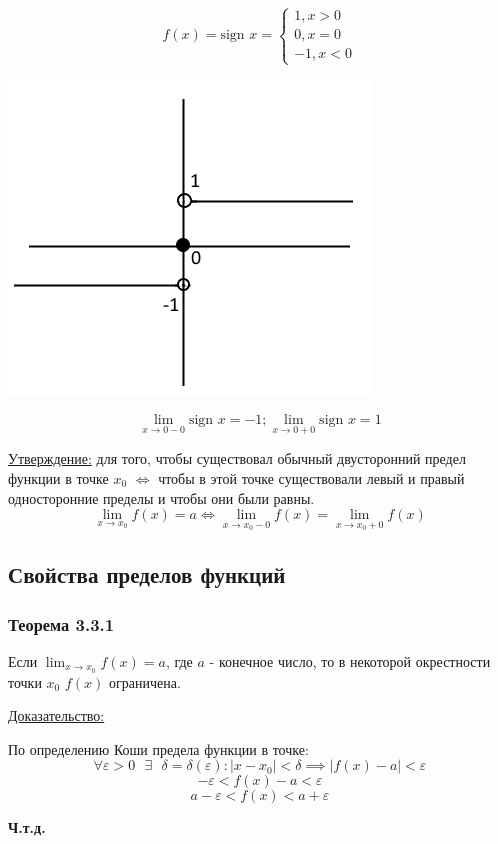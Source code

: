 \documentclass[12pt]{article}
\begin{document}
    \begin{adjustwidth}{1.5em}{1.5em}
        \[f(x) = \text{sign } x = \begin{cases}
            1, x > 0\\
            0, x = 0\\
            -1, x < 0
        \end{cases}
        \]
        \begin{center}
            \includegraphics{3.2.3}
        \end{center}
        \[
            \lim_{x\to 0-0} \text{sign } x = -1; \lim_{x\to 0+0} \text{sign } x = 1
        \]
    \end{adjustwidth}
    \underline{Утверждение:} для того, чтобы существовал обычный двусторонний предел функции в точке $x_0$ $\Leftrightarrow$ чтобы в этой точке существовали левый и правый односторонние пределы и чтобы они были равны.
    \[ \lim_{x \to x_0} f(x) = a \Leftrightarrow \lim_{x \to x_0 - 0}f(x) = \lim_{x \to x_0 + 0} f(x) \]

    \subsection{Свойства пределов функций}
    \subsubsection*{Теорема 3.3.1}\label{th:3.3.1}
    Если $\lim_{x\to x_0}f(x) = a$, где $a$ - конечное число, то в некоторой окрестности точки $x_0$ $f(x)$ ограничена.\par\noindent
    \underline{Доказательство:}
    \begin{adjustwidth}{1.5em}{1.5em}
        По определению Коши предела функции в точке:
        \[ \forall \varepsilon > 0 \text{ } \exists \text{ } \delta = \delta(\varepsilon) : |x - x_0| < \delta \implies |f(x) - a| < \varepsilon \]
        \[ -\varepsilon < f(x) - a < \varepsilon \]
        \[ a - \varepsilon < f(x) < a + \varepsilon \]
        \begin{center}
            \textbf{Ч.т.д.}
        \end{center}
    \end{adjustwidth}
\end{document}
